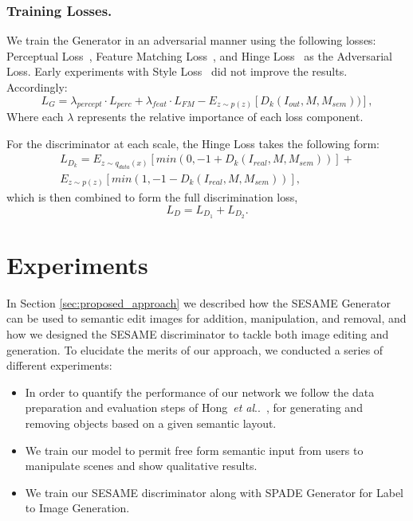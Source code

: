 \documentclass[runningheads]{llncs}
\makeatletter
\DeclareRobustCommand\onedot{\futurelet\@let@token\@onedot}
\def\@onedot{\ifx\@let@token.\else.\null\fi\xspace}
\def\etal{\emph{et al}\onedot}
\def\hong{Hong~\etal~\cite{hong2018learning}}
\makeatother
\begin{document}
\subsubsection{Training Losses.}
We train the Generator in an adversarial manner using the following losses: Perceptual Loss~\cite{Johnson2016Perceptual}, Feature Matching Loss~\cite{NIPS2016_6125}, and Hinge Loss~\cite{lim2017geometric,tranNIPS2017_7136,miyato2018spectral} as the Adversarial Loss.
Early experiments with Style Loss~\cite{Johnson2016Perceptual} did not improve the results.
Accordingly:
\begin{equation}
L_G = \lambda_{percept} \cdot L_{perc} + \lambda_{feat} \cdot L_{FM} 
           - E_{z\sim p(z)}[D_k(I_{out},M,M_{sem}))],
\end{equation}
Where each $\lambda$ represents the relative importance of each loss component.

For the discriminator at each scale, the Hinge Loss takes the following form: 
\begin{multline}
L_{D_k} = E_{z\sim q_{data}(x)}[min(0, -1 + D_k(I_{real},M,M_{sem}))] + \\
E_{z\sim p(z)}[min(1, -1 - D_k(I_{real},M,M_{sem}))],
\end{multline}
which is then combined to form the full discrimination loss,
\begin{equation}
 L_D = L_{D_1} + L_{D_2}.
\end{equation}
\label{ss:preparation}


\section{Experiments}
\label{sec:experiments}

In Section \ref{sec:proposed_approach} we described how the SESAME Generator can be used to semantic edit images for addition, manipulation, and removal, and how we designed the SESAME discriminator to tackle both image editing and generation. To elucidate the merits of our approach, we conducted a series of different experiments:
\begin{itemize}
    \item In order to quantify the performance of our network we follow the data preparation and evaluation steps of \hong{}, for generating and removing objects based on a given semantic layout.
    \item We train our model to permit free form semantic input from users to manipulate scenes and show qualitative results.
    \item We train our SESAME discriminator along with SPADE Generator for Label to Image Generation.
\end{itemize}
\end{document}
